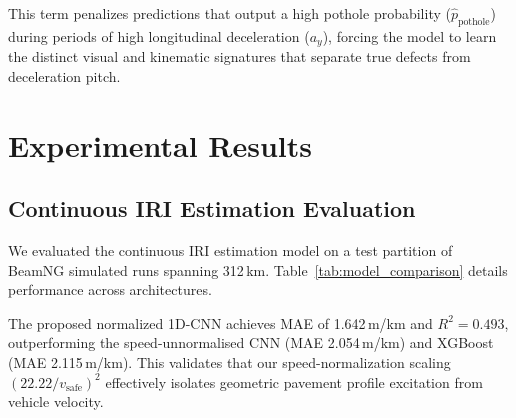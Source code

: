 \documentclass[conference]{IEEEtran}
\begin{document}
This term penalizes predictions that output a high pothole probability ($\hat{p}_{\text{pothole}}$) during periods of high longitudinal deceleration ($a_y$), forcing the model to learn the distinct visual and kinematic signatures that separate true defects from deceleration pitch.

\section{Experimental Results}

\subsection{Continuous IRI Estimation Evaluation}
We evaluated the continuous IRI estimation model on a test partition of BeamNG simulated runs spanning 312\,km.
Table~\ref{tab:model_comparison} details performance across architectures.

\begin{table}[htbp]
\centering
\caption{Model Performance Comparison on Continuous IRI Regression}
\label{tab:model_comparison}
\end{table}

The proposed normalized 1D-CNN achieves MAE of 1.642\,m/km and $R^2 = 0.493$, outperforming the speed-unnormalised CNN (MAE 2.054\,m/km) and XGBoost (MAE 2.115\,m/km).
This validates that our speed-normalization scaling $(22.22/v_{\text{safe}})^2$ effectively isolates geometric pavement profile excitation from vehicle velocity.
\end{document}
